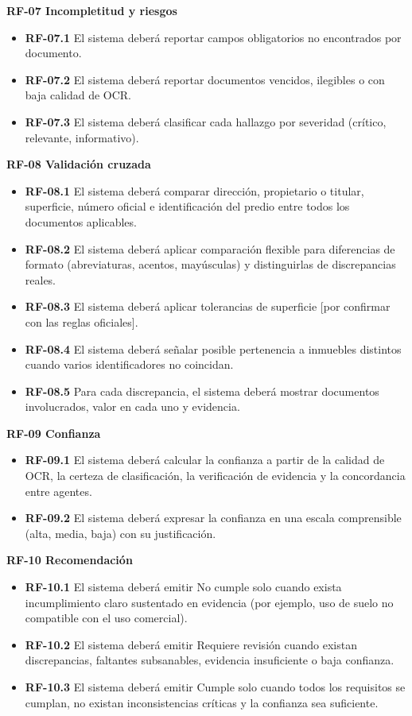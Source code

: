 \documentclass[11pt, a4paper]{article}
\begin{document}
\textbf{RF-07 Incompletitud y riesgos}
\begin{itemize}
    \item \textbf{RF-07.1} El sistema deberá reportar campos obligatorios no encontrados por documento.
    \item \textbf{RF-07.2} El sistema deberá reportar documentos vencidos, ilegibles o con baja calidad de OCR.
    \item \textbf{RF-07.3} El sistema deberá clasificar cada hallazgo por severidad (crítico, relevante, informativo).
\end{itemize}

\textbf{RF-08 Validación cruzada}
\begin{itemize}
    \item \textbf{RF-08.1} El sistema deberá comparar dirección, propietario o titular, superficie, número oficial e identificación del predio entre todos los documentos aplicables.
    \item \textbf{RF-08.2} El sistema deberá aplicar comparación flexible para diferencias de formato (abreviaturas, acentos, mayúsculas) y distinguirlas de discrepancias reales.
    \item \textbf{RF-08.3} El sistema deberá aplicar tolerancias de superficie [por confirmar con las reglas oficiales].
    \item \textbf{RF-08.4} El sistema deberá señalar posible pertenencia a inmuebles distintos cuando varios identificadores no coincidan.
    \item \textbf{RF-08.5} Para cada discrepancia, el sistema deberá mostrar documentos involucrados, valor en cada uno y evidencia.
\end{itemize}

\textbf{RF-09 Confianza}
\begin{itemize}
    \item \textbf{RF-09.1} El sistema deberá calcular la confianza a partir de la calidad de OCR, la certeza de clasificación, la verificación de evidencia y la concordancia entre agentes.
    \item \textbf{RF-09.2} El sistema deberá expresar la confianza en una escala comprensible (alta, media, baja) con su justificación.
\end{itemize}

\textbf{RF-10 Recomendación}
\begin{itemize}
    \item \textbf{RF-10.1} El sistema deberá emitir No cumple solo cuando exista incumplimiento claro sustentado en evidencia (por ejemplo, uso de suelo no compatible con el uso comercial).
    \item \textbf{RF-10.2} El sistema deberá emitir Requiere revisión cuando existan discrepancias, faltantes subsanables, evidencia insuficiente o baja confianza.
    \item \textbf{RF-10.3} El sistema deberá emitir Cumple solo cuando todos los requisitos se cumplan, no existan inconsistencias críticas y la confianza sea suficiente.
\end{itemize}
\end{document}
